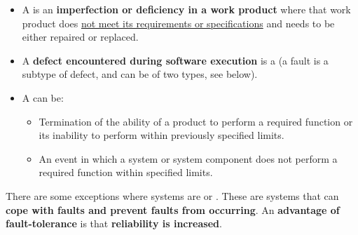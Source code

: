 \begin{itemize}
    \item A  is an \textbf{imperfection or deficiency in a work product} where that work product does \underline{not meet its requirements or specifications} and needs to be either repaired or replaced.

    \item A \textbf{defect encountered during software execution} is a  (a fault is a subtype of defect, and can be of two types, see below).
    
    \item A  can be:
    \begin{itemize}
        \item Termination of the ability of a product to perform a required function or its inability to perform within previously specified limits.

        \item An event in which a system or system component does not perform a required function within specified limits.
    \end{itemize}
\end{itemize}
There are some exceptions where systems are  or . These are systems that can \textbf{cope with faults and prevent faults from occurring}. An \textbf{advantage of fault-tolerance} is that \textbf{reliability is increased}. 

\newpage


